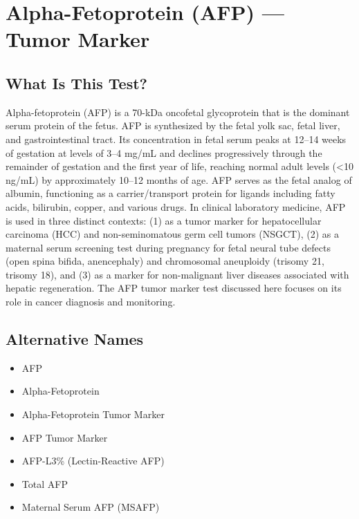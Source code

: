 \chapter{Alpha-Fetoprotein (AFP) --- Tumor Marker}

\section*{What Is This Test?}
Alpha-fetoprotein (AFP) is a 70-kDa oncofetal glycoprotein that is the dominant serum protein of the fetus. AFP is synthesized by the fetal yolk sac, fetal liver, and gastrointestinal tract. Its concentration in fetal serum peaks at 12--14 weeks of gestation at levels of 3--4 mg/mL and declines progressively through the remainder of gestation and the first year of life, reaching normal adult levels (<10 ng/mL) by approximately 10--12 months of age. AFP serves as the fetal analog of albumin, functioning as a carrier/transport protein for ligands including fatty acids, bilirubin, copper, and various drugs. In clinical laboratory medicine, AFP is used in three distinct contexts: (1) as a tumor marker for hepatocellular carcinoma (HCC) and non-seminomatous germ cell tumors (NSGCT), (2) as a maternal serum screening test during pregnancy for fetal neural tube defects (open spina bifida, anencephaly) and chromosomal aneuploidy (trisomy 21, trisomy 18), and (3) as a marker for non-malignant liver diseases associated with hepatic regeneration. The AFP tumor marker test discussed here focuses on its role in cancer diagnosis and monitoring.

\section*{Alternative Names}
\begin{itemize}
  \item AFP
  \item Alpha-Fetoprotein
  \item Alpha-Fetoprotein Tumor Marker
  \item AFP Tumor Marker
  \item AFP-L3\% (Lectin-Reactive AFP)
  \item Total AFP
  \item Maternal Serum AFP (MSAFP)
\end{itemize}
